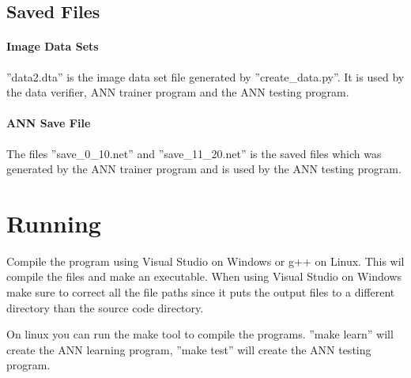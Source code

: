 \subsection{Saved Files}
\paragraph{Image Data Sets}
''data2.dta'' is the image data set file generated by ''create\_data.py''. It is
used by the data verifier, ANN trainer program and the ANN testing program.

\paragraph{ANN Save File}
The files ''save\_0\_10.net'' and ''save\_11\_20.net'' is the saved files which was generated by the ANN trainer
program and is used by the ANN testing program.
	

\section{Running}
Compile the program using Visual Studio on Windows or g++ on Linux. This wil
compile the files and make an executable.  When using Visual Studio on Windows
make sure to correct all the file paths since it puts the output files to a
different directory than the source code directory.

On linux you can run the make tool to compile the programs. ''make learn'' will
create the ANN learning program, ''make test'' will create the ANN testing
program.

